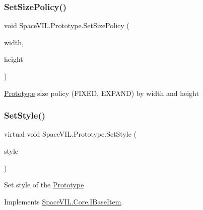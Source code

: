 \mbox{\label{class_space_v_i_l_1_1_prototype_aef3665193fee08b031ad7401dafc8674}} 
\subsubsection{\texorpdfstring{Set\+Size\+Policy()}{SetSizePolicy()}}
{\footnotesize\ttfamily void Space\+V\+I\+L.\+Prototype.\+Set\+Size\+Policy (\begin{DoxyParamCaption}\item[{Size\+Policy}]{width,  }\item[{Size\+Policy}]{height }\end{DoxyParamCaption})}



\mbox{\hyperlink{class_space_v_i_l_1_1_prototype}{Prototype}} size policy (F\+I\+X\+ED, E\+X\+P\+A\+ND) by width and height 

\mbox{\label{class_space_v_i_l_1_1_prototype_ae96644a6ace490afb376fb542161e541}} 
\subsubsection{\texorpdfstring{Set\+Style()}{SetStyle()}}
{\footnotesize\ttfamily virtual void Space\+V\+I\+L.\+Prototype.\+Set\+Style (\begin{DoxyParamCaption}\item[{\mbox{\hyperlink{class_space_v_i_l_1_1_decorations_1_1_style}{Style}}}]{style }\end{DoxyParamCaption})\hspace{0.3cm}{\ttfamily [virtual]}}



Set style of the \mbox{\hyperlink{class_space_v_i_l_1_1_prototype}{Prototype}} 



Implements \mbox{\hyperlink{interface_space_v_i_l_1_1_core_1_1_i_base_item}{Space\+V\+I\+L.\+Core.\+I\+Base\+Item}}.



